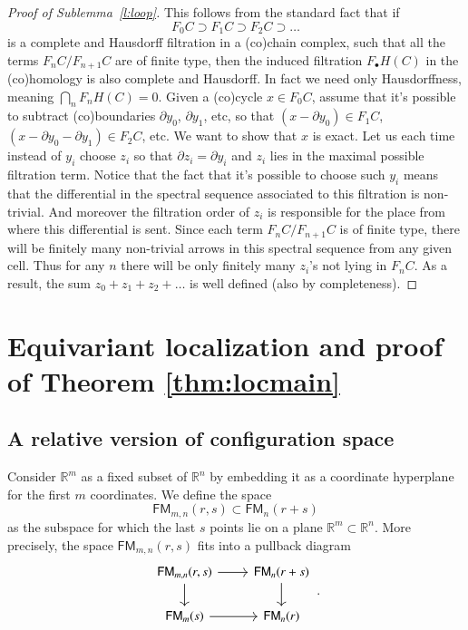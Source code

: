 \documentclass[a4paper]{amsart}
\theoremstyle{plain}
\theoremstyle{definition}
\newtheorem{rem}[thm]{Remark}
\newcommand{\R}{{\mathbb{R}}}
\newcommand{\FM}{\mathsf{FM}}
\begin{document}
\begin{proof}[Proof of Sublemma~\ref{l:loop}]
This follows from the standard fact that if 
\[
F_0C\supset F_1C\supset F_2C \supset\ldots
\]
is a complete and Hausdorff  filtration in a (co)chain complex, such that all the terms $F_nC/F_{n+1}C$ are of finite type, then the induced filtration $F_\bullet H(C)$ in the (co)homology 
is also complete and Hausdorff. In fact we need  only Hausdorffness, meaning $\bigcap_n F_n H(C) =0$. Given a (co)cycle $x\in F_0C$, assume that it\rq{}s possible to subtract (co)boundaries $\partial y_0$, $\partial y_1$, etc,  so that
$(x-\partial y_0)\in F_1C$, $(x-\partial y_0-\partial y_1)\in F_2C$, etc. We want to show that $x$ is exact. Let us each time instead of  $y_i$ choose $z_i$ so that $\partial z_i=\partial y_i$ and $z_i$ lies in the maximal possible filtration term. Notice that the fact that it\rq{}s possible to choose such $y_i$  means that the differential in the  spectral sequence associated to this filtration is non-trivial. And moreover the filtration order of $z_i$ is responsible for the place from where this differential is sent.  Since each term 
$F_nC/F_{n+1}C$ is of finite type, there will be finitely many non-trivial arrows in this spectral sequence from any given cell. Thus for any $n$ there will be only finitely many $z_i$\rq{}s not lying in $F_nC$. As a result, the sum $z_0+z_1+z_2+\ldots$ is well defined (also by completeness). 
\end{proof}

% 

\newcommand{\hFM}{\widehat{\FM}}


\section{Equivariant localization and proof of Theorem \ref{thm:locmain}} \label{sec:auxthmproof}
\subsection{A relative version of configuration space}
Consider $\R^m$ as a fixed subset of $\R^n$ by embedding it as a coordinate hyperplane for the first $m$ coordinates.
We define the space
\[
\FM_{m,n}(r,s) \subset \FM_n(r+s)
\]
as the subspace for which the last $s$ points lie on a plane $\R^m\subset \R^n$.
More precisely, the space $\FM_{m,n}(r,s)$ fits into a pullback diagram
\[
 \begin{tikzcd}
\FM_{m,n}(r,s) \ar{r}\ar{d} & \FM_n(r+s) \ar{d} \\
\FM_m(s) \ar{r} & \FM_n(r)
 \end{tikzcd}\, .
\]
\end{document}
